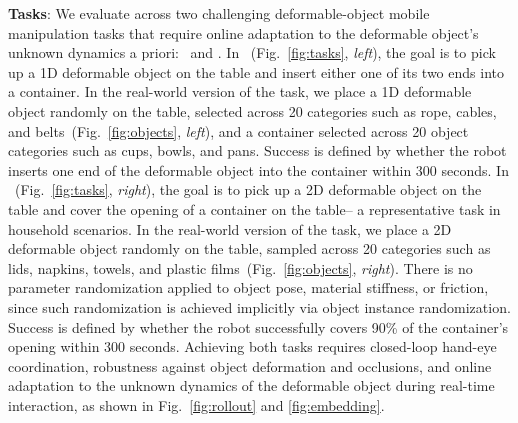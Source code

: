 \textbf{Tasks}: We evaluate \methodname{} across two challenging deformable-object mobile manipulation tasks that require online adaptation to the deformable object's unknown dynamics a priori: \taskone~and \tasktwo. In \taskone~(Fig.~\ref{fig:tasks}, \textit{left}), the goal is to pick up a 1D deformable object on the table and insert either one of its two ends into a container. In the real-world version of the task, we place a 1D deformable object randomly on the table, selected across 20 categories such as rope, cables, and belts~(Fig.~\ref{fig:objects}, \textit{left}), and a container selected across 20 object categories such as cups, bowls, and pans. Success is defined by whether the robot inserts one end of the deformable object into the container within 300 seconds. 
In \tasktwo~(Fig.~\ref{fig:tasks}, \textit{right}), the goal is to pick up a 2D deformable object on the table and cover the opening of a container on the table-- a representative task in household scenarios. In the real-world version of the task, we place a 2D deformable object randomly on the table, sampled across 20 categories such as lids, napkins, towels, and plastic films~(Fig.~\ref{fig:objects}, \textit{right}). There is no parameter randomization applied to object pose, material stiffness, or friction, since such randomization is achieved implicitly via object instance randomization. Success is defined by whether the robot successfully covers 90\% of the container's opening within 300 seconds. 
Achieving both tasks requires closed-loop hand-eye coordination, robustness against object deformation and occlusions, and online adaptation to the unknown dynamics of the deformable object during real-time interaction, as shown in Fig.~\ref{fig:rollout} and \ref{fig:embedding}.

